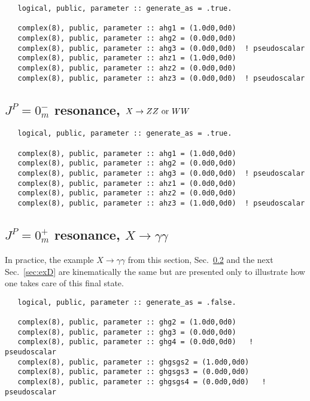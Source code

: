 \documentclass[aps,superscriptaddress,nofootinbib]{revtex4}
\begin{document}
\begin{verbatim}
   logical, public, parameter :: generate_as = .true.

   complex(8), public, parameter :: ahg1 = (1.0d0,0d0)
   complex(8), public, parameter :: ahg2 = (0.0d0,0d0)
   complex(8), public, parameter :: ahg3 = (0.0d0,0d0)  ! pseudoscalar
   complex(8), public, parameter :: ahz1 = (1.0d0,0d0)
   complex(8), public, parameter :: ahz2 = (0.0d0,0d0)  
   complex(8), public, parameter :: ahz3 = (0.0d0,0d0)  ! pseudoscalar
\end{verbatim}

\subsection{ $J^P = 0^-_m$ resonance, $X \to ZZ~{\rm or}~WW$}
\label{sec:exB}

\begin{verbatim}
   logical, public, parameter :: generate_as = .true.

   complex(8), public, parameter :: ahg1 = (1.0d0,0d0)
   complex(8), public, parameter :: ahg2 = (0.0d0,0d0)
   complex(8), public, parameter :: ahg3 = (0.0d0,0d0)  ! pseudoscalar
   complex(8), public, parameter :: ahz1 = (0.0d0,0d0)
   complex(8), public, parameter :: ahz2 = (0.0d0,0d0)  
   complex(8), public, parameter :: ahz3 = (1.0d0,0d0)  ! pseudoscalar
\end{verbatim}

\subsection{ $J^P = 0^+_m$ resonance, $X \to \gamma \gamma$}
\label{sec:exC}

In practice, the example $X \to \gamma \gamma$ from this section, Sec.~\ref{sec:exC} and the next Sec.~\ref{sec:exD} are 
kinematically the same but are presented only to illustrate how one takes care of this final state.  

\begin{verbatim}
   logical, public, parameter :: generate_as = .false.

   complex(8), public, parameter :: ghg2 = (1.0d0,0d0)
   complex(8), public, parameter :: ghg3 = (0.0d0,0d0)
   complex(8), public, parameter :: ghg4 = (0.0d0,0d0)   ! pseudoscalar
   complex(8), public, parameter :: ghgsgs2 = (1.0d0,0d0)
   complex(8), public, parameter :: ghgsgs3 = (0.0d0,0d0)
   complex(8), public, parameter :: ghgsgs4 = (0.0d0,0d0)   ! pseudoscalar 
\end{verbatim}
\end{document}
